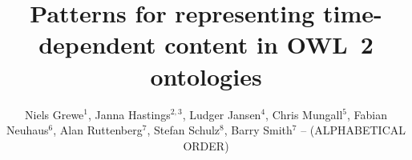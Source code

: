 \documentclass[10pt]{bmc_article}
\newenvironment{bmcformat}{\baselineskip20pt\sloppy\setboolean{publ}{false}}{\baselineskip20pt\sloppy}
\begin{document}
\begin{bmcformat}





\title{Patterns for representing time-dependent content in OWL~2 ontologies}

 

\author{Niels Grewe$^{1}$,%
  Janna Hastings$^{2,3}$,%
  Ludger Jansen$^{4}$,%
  Chris Mungall$^{5}$,%
  Fabian Neuhaus$^{6}$,%
  Alan Ruttenberg$^{7}$,%
  Stefan Schulz$^{8}$,%
  Barry Smith$^{7}$ -- %
  (ALPHABETICAL ORDER)
}
 
\address{%
    \iid(1)Institute of Philosophy, University of Rostock, Germany\\
    \iid(2)Cheminformatics and Metabolism, European Bioinformatics Institute (EMBL-EBI), Cambridge, UK\\
    \iid(3)Department of Philosophy, University of Geneva, Switzerland\\
    \iid(4)Institute of Philosophy, University of M\"unster, Germany\\
    \iid(5)Genomics Division, Lawrence Berkeley National Laboratory, Berkeley, CA, USA\\
    \iid(6)Institute of Knowledge and Language Engineering, University of Magdeburg, Germany \\
    \iid(7)Institute for Health Informatics, State University of New York, Buffalo, NY, USA\\
    \iid(8)Institute for Medical Informatics, Statistics and Documentation, Medical University of Graz, Austria 
}%


\end{bmcformat}
\end{document}
